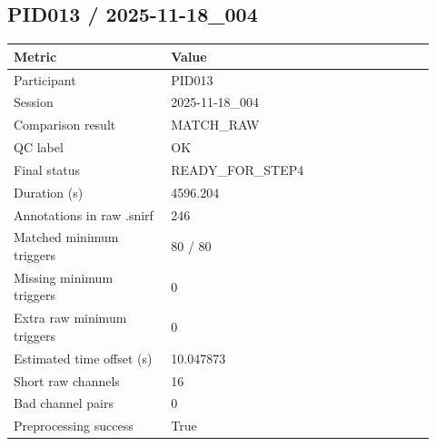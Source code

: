 \subsection*{PID013 / 2025-11-18\_004}
\begin{tabular}{p{0.34\linewidth}p{0.58\linewidth}}
\toprule
Metric & Value\\
\midrule
Participant & PID013\\
Session & 2025-11-18\_004\\
Comparison result & MATCH\_RAW\\
QC label & OK\\
Final status & READY\_FOR\_STEP4\\
Duration (s) & 4596.204\\
Annotations in raw .snirf & 246\\
Matched minimum triggers & 80 / 80\\
Missing minimum triggers & 0\\
Extra raw minimum triggers & 0\\
Estimated time offset (s) & 10.047873\\
Short raw channels & 16\\
Bad channel pairs & 0\\
Preprocessing success & True\\
\bottomrule
\end{tabular}

